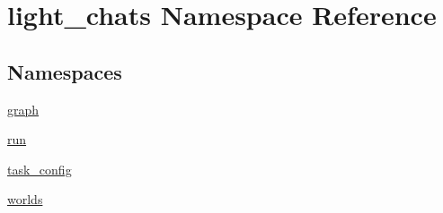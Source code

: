 \hypertarget{namespacelight__chats}{}\section{light\+\_\+chats Namespace Reference}
\label{namespacelight__chats}
\subsection*{Namespaces}
\begin{DoxyCompactItemize}
\item 
 \hyperlink{namespacelight__chats_1_1graph}{graph}
\item 
 \hyperlink{namespacelight__chats_1_1run}{run}
\item 
 \hyperlink{namespacelight__chats_1_1task__config}{task\+\_\+config}
\item 
 \hyperlink{namespacelight__chats_1_1worlds}{worlds}
\end{DoxyCompactItemize}
